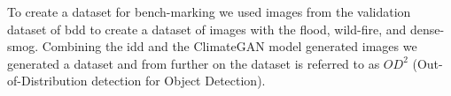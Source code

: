     To create a dataset for bench-marking we used images from the validation dataset of \acrshort{bdd} to create a dataset of images with the flood, wild-fire, and dense-smog. Combining the \acrshort{idd} and the ClimateGAN model generated images we generated a dataset and from further on the dataset is referred to as $OD^{2}$ (Out-of-Distribution detection for Object Detection). 
    
    
